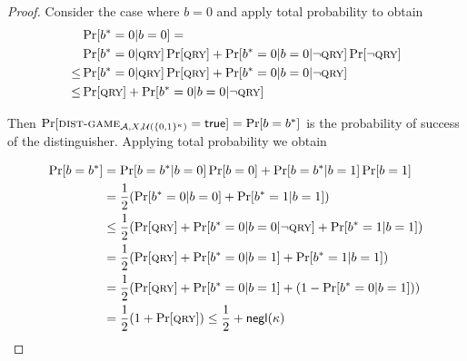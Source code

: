 \begin{proof}
  Consider the case where $b = 0$ and apply total probability to obtain
  \begin{align*}
    &\Pr[b^* = 0|b = 0] =\\
    &\Pr[b^* = 0|\textsc{qry}]\Pr[\textsc{qry}] +
      \Pr[b^* = 0|b = 0|\lnot \textsc{qry}]\Pr[\lnot \textsc{qry}]\\
    \leq &\Pr[b^* = 0|\textsc{qry}]\Pr[\textsc{qry}] +
      \Pr[b^* = 0|b = 0|\lnot \textsc{qry}]\\
    \leq &\Pr[\textsc{qry}] + \Pr[b^* = 0|b = 0|\lnot \textsc{qry}]
  \end{align*}

  Then
  $
    \Pr[\textsc{dist}\-\text{-}\-\textsc{game}_{\mathcal{A},X,\mathcal{U}(\{0,1\}^\kappa)} = \mathsf{true}]
    =
    \Pr[b = b^*]
  $ is the probability of success of the distinguisher.
  Applying total probability we obtain

  \begin{align*}
    \Pr[b = b^*] &= \Pr[b = b^*|b = 0]\Pr[b = 0] + \Pr[b = b^*|b = 1]\Pr[b = 1]\\
                 &= \frac{1}{2}(\Pr[b^* = 0|b = 0] + \Pr[b^* = 1|b = 1])\\
                 &\leq \frac{1}{2}(\Pr[\textsc{qry}] + \Pr[b^* = 0|b = 0|\lnot \textsc{qry}]
                 + \Pr[b^* = 1|b = 1])\\
                 &= \frac{1}{2}(\Pr[\textsc{qry}] + \Pr[b^* = 0|b = 1]
                 + \Pr[b^* = 1|b = 1])\\
                 &= \frac{1}{2}(\Pr[\textsc{qry}] + \Pr[b^* = 0|b = 1]
                 + (1 - \Pr[b^* = 0|b = 1]))\\
                 &= \frac{1}{2}(1 + \Pr[\textsc{qry}]) \leq \frac{1}{2} + \textsf{negl}(\kappa)
  \end{align*}
\end{proof}
